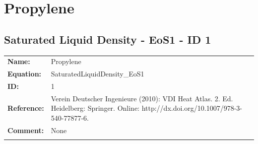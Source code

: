\section{Propylene}
%
\subsection{Saturated Liquid Density - EoS1 - ID 1}
%
\begin{tabular}[l]{|lp{11.5cm}|}
\hline
\addlinespace

\textbf{Name:} & Propylene \\
\textbf{Equation:} & SaturatedLiquidDensity\_EoS1 \\
\textbf{ID:} & 1 \\
\textbf{Reference:} & Verein Deutscher Ingenieure (2010): VDI Heat Atlas. 2. Ed. Heidelberg: Springer. Online: http://dx.doi.org/10.1007/978-3-540-77877-6. \\
\textbf{Comment:} & None \\

\addlinespace
\hline
\end{tabular}
\newline


